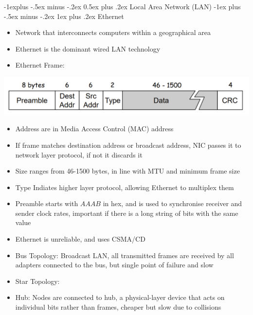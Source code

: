 \documentclass[10pt, landscape]{article}
\makeatletter
\renewcommand{\section}{\@startsection{section}{1}{0mm}%
                                {-1ex plus -.5ex minus -.2ex}%
                                {0.5ex plus .2ex}%
                                {\normalfont\large\bfseries}}
\renewcommand{\section}{\@startsection{section}{2}{0mm}%
                                {-1explus -.5ex minus -.2ex}%
                                {0.5ex plus .2ex}%
                                {\normalfont\normalsize\bfseries}}
\renewcommand{\subsection}{\@startsection{subsection}{3}{0mm}%
                                {-1ex plus -.5ex minus -.2ex}%
                                {1ex plus .2ex}%
                                {\normalfont\small\bfseries}}%
\makeatother
\begin{document}
\begin{multicols*}{3}
\section{Local Area Network (LAN)}
\subsection{Ethernet}
\begin{itemize}
    \item Network that interconnects computers within a geographical area
    \item Ethernet is the dominant wired LAN technology
    \item Ethernet Frame:
\end{itemize}

\begin{center}
    \includegraphics[width=0.9\linewidth]{eth.png}
\end{center}

\begin{itemize}
    \item Address are in Media Access Control (MAC) address
    \item If frame matches destination address or broadcast address, NIC passes it to network layer protocol, if not it discards it
    \item Size ranges from 46-1500 bytes, in line with MTU and minimum frame size
    \item Type Indiates higher layer protocol, allowing Ethernet to multiplex them
    \item Preamble starts with $AAAB$ in hex, and is used to synchronise receiver and sender clock rates, important if there is a long string of bits with the same value
    \item Ethernet is unreliable, and uses CSMA/CD
    \item Bus Topology: Broadcast LAN, all transmitted frames are received by all adapters connected to the bus, but single point of failure and slow
    \item Star Topology:
    \item Hub: Nodes are connected to hub, a physical-layer device that acts on individual bits rather than frames, cheaper but slow due to collisions
\end{itemize}

\end{multicols*}
\end{document}
